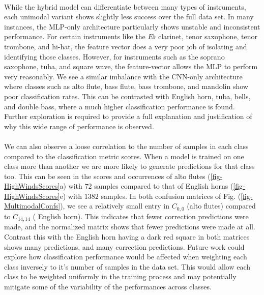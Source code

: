 \documentclass[12pt,letterpaper]{article}
\begin{document}
\paragraph*{}While the hybrid model can differentiate between many types of instruments, each unimodal variant shows slightly less success over the full data set. In many instances, the MLP-only architecture particularly shows unstable and inconsistent performance. For certain instruments like the $E\flat$ clarinet, tenor saxophone, tenor trombone, and hi-hat, the feature vector does a very poor job of isolating and identifying those classes. However, for instruments such as the soprano saxophone, tuba, and square wave, the feature-vector allows the MLP to perform very reasonably. We see a similar imbalance with the CNN-only architecture where classes such as alto flute, bass flute, bass trombone, and mandolin show poor classification rates. This can be contrasted with English horn, tuba, bells, and double bass, where a much higher classification performance is found. Further exploration is required to provide a full explanation and justification of why this wide range of performance is observed.

\paragraph*{}We can also observe a loose correlation to the number of samples in each class compared to the classification metric scores. When a model is trained on one class more than another we are more likely to generate predictions for that class too. This can be seen in the scores and occurrences of alto flutes (\ref{fig-HighWindsScores}a) with $72$ samples compared to that of English horns (\ref{fig-HighWindsScores}e) with $1382$ samples. In both confusion matrices of Fig. (\ref{fig-MultimodalConfs}), we see a relatively small entry in $C_{0,0}$ (alto flutes) compared to $C_{14,14}$ ( English horn). This indicates that fewer correction predictions were made, and the normalized matrix shows that fewer predictions were made at all. Contrast this with the English horn having a dark red square in both matrices shows many predictions, and many correction predictions. Future work could explore how classification performance would be affected when weighting each class inversely to it's number of samples in the data set. This would allow each class to be weighted uniformly in the training process and may potentially mitigate some of the variability of the performances across classes.
\end{document}
